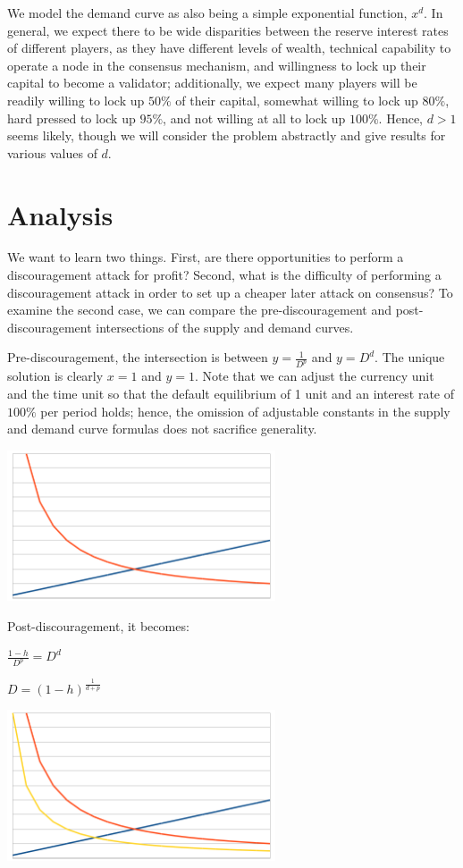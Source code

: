 \documentclass[12pt]{article}
\begin{document}
We model the demand curve as also being a simple exponential function, $x^d$. In general, we expect there to be wide disparities between the reserve interest rates of different players, as they have different levels of wealth, technical capability to operate a node in the consensus mechanism, and willingness to lock up their capital to become a validator; additionally, we expect many players will be readily willing to lock up $50\%$ of their capital, somewhat willing to lock up $80\%$, hard pressed to lock up $95\%$, and not willing at all to lock up $100\%$. Hence, $d > 1$ seems likely, though we will consider the problem abstractly and give results for various values of $d$.

\section{Analysis}

We want to learn two things. First, are there opportunities to perform a discouragement attack for profit? Second, what is the difficulty of performing a discouragement attack in order to set up a cheaper later attack on consensus? To examine the second case, we can compare the pre-discouragement and post-discouragement intersections of the supply and demand curves.

Pre-discouragement, the intersection is between $y = \frac{1}{D^p}$ and $y = D^d$. The unique solution is clearly $x=1$ and $y=1$. Note that we can adjust the currency unit and the time unit so that the default equilibrium of 1 unit and an interest rate of $100\%$ per period holds; hence, the omission of adjustable constants in the supply and demand curve formulas does not sacrifice generality.

\includegraphics[width=300px]{disc_chart1.png}

Post-discouragement, it becomes:

$\frac{1-h}{D^p} = D^d$

$D=(1-h)^{\frac{1}{d+p}}$

\includegraphics[width=300px]{disc_chart2.png}
\end{document}
